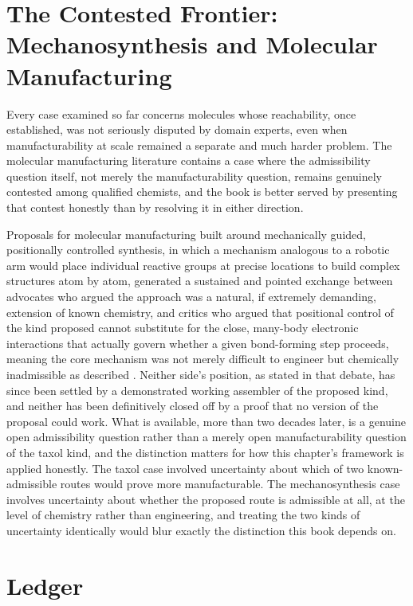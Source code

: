 \documentclass[11pt]{book}
\begin{document}
\section{The Contested Frontier: Mechanosynthesis and Molecular Manufacturing}

Every case examined so far concerns molecules whose reachability, once established, was not seriously disputed by domain experts, even when manufacturability at scale remained a separate and much harder problem. The molecular manufacturing literature contains a case where the admissibility question itself, not merely the manufacturability question, remains genuinely contested among qualified chemists, and the book is better served by presenting that contest honestly than by resolving it in either direction.

Proposals for molecular manufacturing built around mechanically guided, positionally controlled synthesis, in which a mechanism analogous to a robotic arm would place individual reactive groups at precise locations to build complex structures atom by atom, generated a sustained and pointed exchange between advocates who argued the approach was a natural, if extremely demanding, extension of known chemistry, and critics who argued that positional control of the kind proposed cannot substitute for the close, many-body electronic interactions that actually govern whether a given bond-forming step proceeds, meaning the core mechanism was not merely difficult to engineer but chemically inadmissible as described \cite{drexlersmalley2003}. Neither side's position, as stated in that debate, has since been settled by a demonstrated working assembler of the proposed kind, and neither has been definitively closed off by a proof that no version of the proposal could work. What is available, more than two decades later, is a genuine open admissibility question rather than a merely open manufacturability question of the taxol kind, and the distinction matters for how this chapter's framework is applied honestly. The taxol case involved uncertainty about which of two known-admissible routes would prove more manufacturable. The mechanosynthesis case involves uncertainty about whether the proposed route is admissible at all, at the level of chemistry rather than engineering, and treating the two kinds of uncertainty identically would blur exactly the distinction this book depends on.

\section{Ledger}
\end{document}
